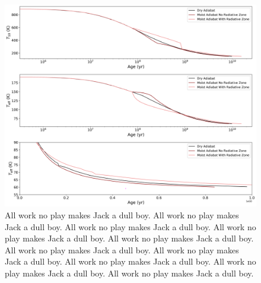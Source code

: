 \documentclass[11pt]{ucscthesisbs}
\begin{document}
\begin{figure}[ht]
 \centerline{
  \includegraphics[scale=0.5]{figures/dry_moist_radiative_u_cooling_curves_adiabat_comparisons.png}
 }
\caption[Inhibition of convection on Uranus]
{All work no play makes Jack a dull boy. All work no play makes Jack a dull boy. All work no play makes Jack a dull boy. All work no play makes Jack a dull boy. All work no play makes Jack a dull boy. All work no play makes Jack a dull boy. All work no play makes Jack a dull boy. All work no play makes Jack a dull boy. All work no play makes Jack a dull boy. All work no play makes Jack a dull boy. }
\label{fig:evolve_adiabats}
\end{figure}
\end{document}
